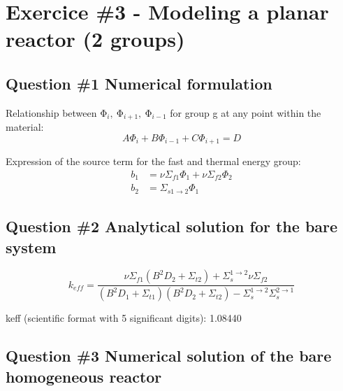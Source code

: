 \documentclass[11pt,a4paper]{article}
\begin{document}

\newpage
\section{Exercice \#3 - Modeling a planar reactor (2 groups)}

\subsection{Question \#1 Numerical formulation}

Relationship between $\mathrm{\Phi}_i,\ \mathrm{\Phi}_{i+1},\ \mathrm{\Phi}_{i-1}$ for group g at any point within the material:
\begin{equation}
	A \Phi_i + B \Phi_{i-1} +C \Phi_{i+1} = D
\end{equation}

Expression of the source term for the fast and thermal energy group:
\begin{equation}
	\begin{split}
		b_1 &= \nu \Sigma_{f1} \Phi_1 + \nu \Sigma_{f2} \Phi_2 \\
		b_2 &= \Sigma_{s1 \rightarrow 2} \Phi_1
	\end{split}
	\end{equation}

\subsection{Question \#2 Analytical solution for the bare system}
\begin{equation}
	k_{eff}= \frac{\nu \Sigma_{f1} (B^2D_2 + \Sigma_{t2}) + \Sigma_{s}^{1 \rightarrow 2} \nu \Sigma_{f2}}{(B^2D_1 + \Sigma_{t1})(B^2D_2 + \Sigma_{t2}) - \Sigma_s^{1 \rightarrow 2} \Sigma_s^{2 \rightarrow 1}}
\end{equation}


keff (scientific format with 5 significant digits): 1.08440 \\

\subsection{Question \#3 Numerical solution of the bare homogeneous reactor}
\end{document}
